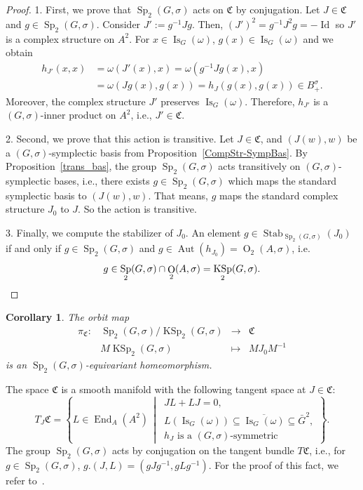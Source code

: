 \documentclass[a4paper,oneside,11pt]{amsart}
\DeclareMathOperator{\Aut}{Aut}
\DeclareMathOperator{\Id}{Id}
\DeclareMathOperator{\Sp}{Sp}
\DeclareMathOperator{\OO}{O}
\DeclareMathOperator{\Stab}{Stab}
\DeclareMathOperator{\End}{End}
\DeclareMathOperator{\KSp}{KSp}
\DeclareMathOperator{\Is}{Is}
\newcommand{\midwd}{\,\middle\vert\,}
\theoremstyle{plain}
\newtheorem{cor}[teo]{Corollary}
\theoremstyle{definition}
\theoremstyle{remark}
\begin{document}
\begin{proof}
1. First, we prove that $\Sp_2(G,\sigma)$ acts on $\mathfrak C$ by conjugation. Let $J\in \mathfrak C$ and $g\in\Sp_2(G,\sigma)$. Consider $J':=g^{-1}Jg$. Then, $(J')^2=g^{-1}J^2g=-\Id$ so $J'$ is a complex structure on $A^2$. For $x\in\Is_G(\omega)$, $g(x)\in\Is_G(\omega)$ and we obtain
\begin{align*}
    h_{J'}(x,x)&=\omega(J'(x),x)=\omega(g^{-1}Jg(x),x)\\
    &=\omega(Jg(x),g(x))=h_J(g(x),g(x))\in B^{\sigma}_+.
\end{align*}
Moreover, the complex structure $J'$ preserves $\Is_G(\omega)$. Therefore, $h_{J'}$ is a $(G,\sigma)$-inner product on $A^2$, i.e., $J'\in \mathfrak C$.

2. Second, we prove that this action is transitive. Let $J\in \mathfrak C$, and $(J(w),w)$ be a $(G,\sigma)$-symplectic basis from Proposition~\ref{CompStr-SympBas}. By Proposition~\ref{trans_bas}, the group $\Sp_2(G,\sigma)$ acts transitively on $(G,\sigma)$-symplectic bases, i.e., there exists $g\in\Sp_2(G,\sigma)$ which maps the standard symplectic basis to $(J(w),w)$. That means, $g$ maps the standard complex structure $J_0$ to $J$. So the action is transitive.

3. Finally, we compute the stabilizer of $J_0$. An element $g\in\Stab_{\Sp_2(G,\sigma)}(J_0)$ if and only if
$g\in\Sp_2(G,\sigma)$ and $g\in \Aut(h_{J_0})=\OO_2(A,\sigma)$, i.e.
\begin{equation*}
g\in\Sp_2(G,\sigma)\cap\OO_2(A,\sigma)= \KSp_2(G,\sigma).\qedhere
\end{equation*}
\end{proof}

\begin{cor}
The orbit map
$$\begin{matrix}
\pi_\mathfrak C\colon & \Sp_2(G,\sigma)/\KSp_2(G,\sigma) & \to & \mathfrak C \\
 & M\KSp_2(G,\sigma) & \mapsto & M J_0 M^{-1}
\end{matrix}$$
is an $\Sp_2(G,\sigma)$-equivariant homeomorphism.
\end{cor}

The space $\mathfrak{C}$ is a smooth manifold with the following tangent space at $J\in\mathfrak{C}$:
$$T_J\mathfrak{C}=\left\{L\in\End_A(A^2)\midwd\begin{array}{l}
JL+LJ=0,\\
L(\Is_G(\omega))\subseteq\overline{\Is_G(\omega)}\subseteq \bar G^2,\\
h_J\text{ is a $(G,\sigma)$-symmetric}
\end{array}\right\}.$$
The group $\Sp_2(G,\sigma)$ acts by conjugation on the tangent bundle $T\mathfrak{C}$, i.e., for $g\in \Sp_2(G,\sigma)$, $g.(J,L)=(gJg^{-1},gLg^{-1})$.
For the proof of this fact, we refer to~\cite[Proposition~6.3]{HKRW}.
\end{document}
